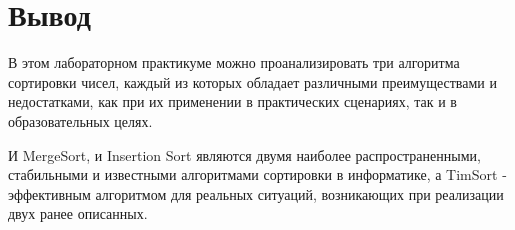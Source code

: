 
\section{Вывод}

В этом лабораторном практикуме можно проанализировать
три алгоритма сортировки чисел, каждый из которых обладает
различными преимуществами и недостатками, как при их
применении в практических сценариях, так и в образовательных целях.

И MergeSort, и Insertion Sort являются двумя наиболее
распространенными, стабильными и известными алгоритмами
сортировки в информатике, а TimSort - эффективным алгоритмом
для реальных ситуаций, возникающих при реализации двух ранее описанных.
